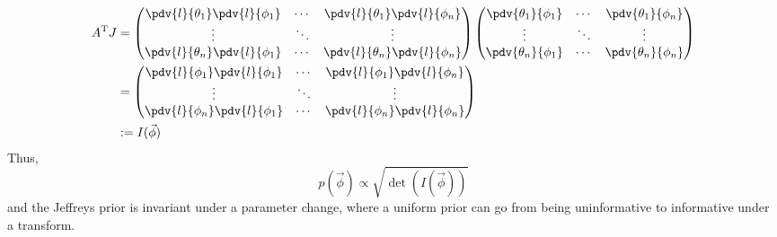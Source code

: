 \documentclass{dwnotes}         		        %
\begin{document}
\begin{align*}
  A^{\rm T}J &= 
\begin{pmatrix}
  \pdv{l}{\theta_1} \pdv{l}{\phi_1} & \cdots & \pdv{l}{\theta_1} \pdv{l}{\phi_n} \\
  \vdots & \ddots & \vdots \\
  \pdv{l}{\theta_n} \pdv{l}{\phi_1} & \cdots & \pdv{l}{\theta_n}
  \pdv{l}{\phi_n} \\
\end{pmatrix}
\begin{pmatrix}
  \pdv{\theta_1}{\phi_1} & \cdots & \pdv{\theta_1}{\phi_n} \\
  \vdots & \ddots & \vdots \\
  \pdv{\theta_n}{\phi_1} & \cdots & \pdv{\theta_n}{\phi_n}
\end{pmatrix}
\\ &=
\begin{pmatrix}
  \pdv{l}{\phi_1} \pdv{l}{\phi_1} & \cdots & \pdv{l}{\phi_1} \pdv{l}{\phi_n} \\
  \vdots & \ddots & \vdots \\
  \pdv{l}{\phi_n} \pdv{l}{\phi_1} & \cdots & \pdv{l}{\phi_n}
  \pdv{l}{\phi_n} \\
\end{pmatrix}\\
& := I(\vec{\phi})
\end{align*}
Thus,
\[ p(\vec{\phi}) \propto \sqrt{\det( I(\vec{\phi}) )} \] and the
Jeffreys prior is invariant under a parameter change, where a uniform
prior can go from being uninformative to informative under a
transform.
\end{document}
